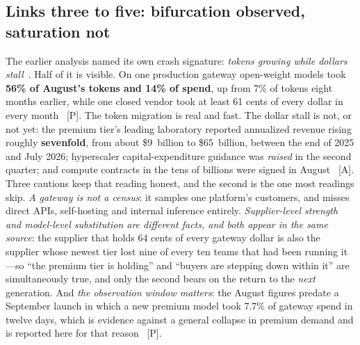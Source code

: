 \subsection{Links three to five: bifurcation observed, saturation not}
\label{sec:sat-settle}

The earlier analysis named its own crash signature: \emph{tokens growing while dollars stall}~\cite{matsuoka-memory}. Half of it is visible. On one production gateway open-weight models took \textbf{56\% of August's tokens and 14\% of spend}, up from 7\% of tokens eight months earlier, while one closed vendor took at least 61 cents of every dollar in every month~\cite{vercel-sep26} [P]. The token migration is real and fast. The dollar stall is not, or not yet: the premium tier's leading laboratory reported annualized revenue rising roughly \textbf{sevenfold}, from about \$9~billion to \$65~billion, between the end of 2025 and July 2026; hyperscaler capital-expenditure guidance was \emph{raised} in the second quarter; and compute contracts in the tens of billions were signed in August~\cite{premium-revenue} [A]. Three cautions keep that reading honest, and the second is the one most readings skip. \emph{A gateway is not a census}: it samples one platform's customers, and misses direct APIs, self-hosting and internal inference entirely. \emph{Supplier-level strength and model-level substitution are different facts, and both appear in the same source}: the supplier that holds 64 cents of every gateway dollar is also the supplier whose newest tier lost nine of every ten teams that had been running it---so ``the premium tier is holding'' and ``buyers are stepping down within it'' are simultaneously true, and only the second bears on the return to the \emph{next} generation. And \emph{the observation window matters}: the August figures predate a September launch in which a new premium model took 7.7\% of gateway spend in twelve days, which is evidence against a general collapse in premium demand and is reported here for that reason~\cite{vercel-sep26} [P].

